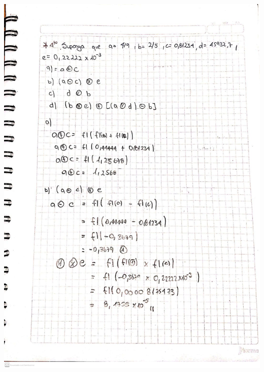 \documentclass[12pt]{article}
\begin{document}
\begin{itemize}
\begin{minipage}{0.95\textwidth}
    \raggedleft
    \includegraphics[width=1.15\textwidth]{inFiles/Figures/ejer4.jpeg}
\end{minipage}
\vspace{1.5cm}


\end{itemize}
\end{document}
